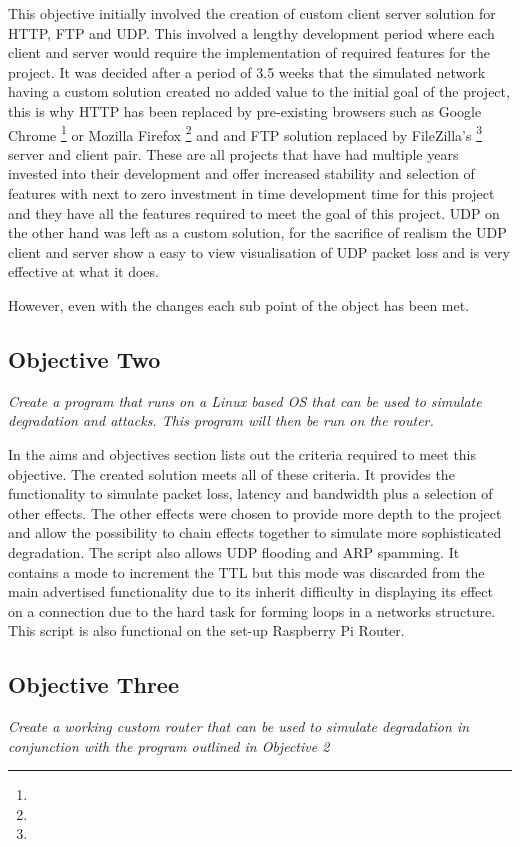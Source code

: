 This objective initially involved the creation of custom client server solution for HTTP, FTP and UDP. This involved a lengthy development period where each client and server would require the implementation of required features for the project. It was decided after a period of 3.5 weeks that the simulated network having a custom solution created no added value to the initial goal of the project, this is why HTTP has been replaced by pre-existing browsers such as Google Chrome \footnote{\chromeUrl} or Mozilla Firefox \footnote{\firefoxUrl} and and FTP solution replaced by FileZilla's \footnote{\fileZillaUrl} server and client pair. These are all projects that have had multiple years invested into their development and offer increased stability and selection of features with next to zero investment in time development time for this project and they have all the features required to meet the goal of this project. UDP on the other hand was left as a custom solution, for the sacrifice of realism the UDP client and server show a easy to view visualisation of UDP packet loss and is very effective at what it does.

However, even with the changes each sub point of the object has been met.

\subsection{Objective Two}
{\it Create a program that runs on a Linux based OS that can be used to simulate degradation and attacks. This program will then be run on the router.}

In the aims and objectives section lists out the criteria required to meet this objective. The created solution meets all of these criteria. It provides the functionality to simulate packet loss, latency and bandwidth plus a selection of other effects. The other effects were chosen to provide more depth to the project and allow the possibility to chain effects together to simulate more sophisticated degradation. The script also allows UDP flooding and ARP spamming. It contains a mode to increment the TTL but this mode was discarded from the main advertised functionality due to its inherit difficulty in displaying its effect on a connection due to the hard task for forming loops in a networks structure. This script is also functional on the set-up Raspberry Pi Router.


\subsection{Objective Three}
{\it Create a working custom router that can be used to simulate degradation in conjunction with the program outlined in Objective 2}

